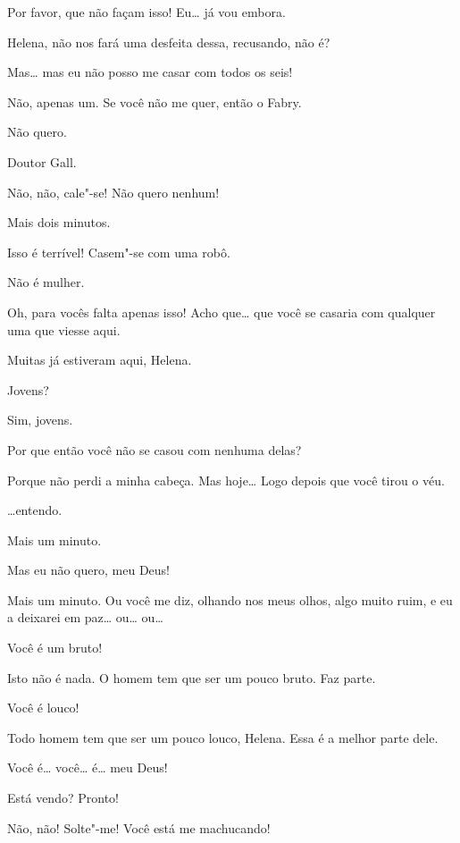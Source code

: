  Por favor, que não façam isso! Eu\ldots{} já vou embora.

 Helena, não nos fará uma desfeita dessa, recusando, não é?

 Mas\ldots{} mas eu não posso me casar com todos os seis!

 Não, apenas um. Se você não me quer, então o Fabry.

 Não quero.

 Doutor Gall.

 Não, não, cale"-se! Não quero nenhum!

 Mais dois minutos.

 Isso é terrível! Casem"-se com uma robô.

 Não é mulher.

 Oh, para vocês falta apenas isso! Acho que\ldots{} que você se casaria com
qualquer uma que viesse aqui.

 Muitas já estiveram aqui, Helena.

 Jovens?

 Sim, jovens.

 Por que então você não se casou com nenhuma delas?

 Porque não perdi a minha cabeça. Mas hoje\ldots{} Logo depois que você
tirou o véu.

 \ldots{}entendo.

 Mais um minuto.

 Mas eu não quero, meu Deus!

  Mais um minuto. Ou você me
diz, olhando nos meus olhos, algo muito ruim, e eu a deixarei em paz\ldots{} ou\ldots{} ou\ldots{}

 Você é um bruto!

 Isto não é nada. O homem tem que ser um pouco bruto. Faz parte.

 Você é louco!

 Todo homem tem que ser um pouco louco, Helena. Essa é a melhor parte
dele.

 Você é\ldots{} você\ldots{} é\ldots{} meu Deus!

 Está vendo? Pronto!

 Não, não! Solte"-me! Você está me machucando!

